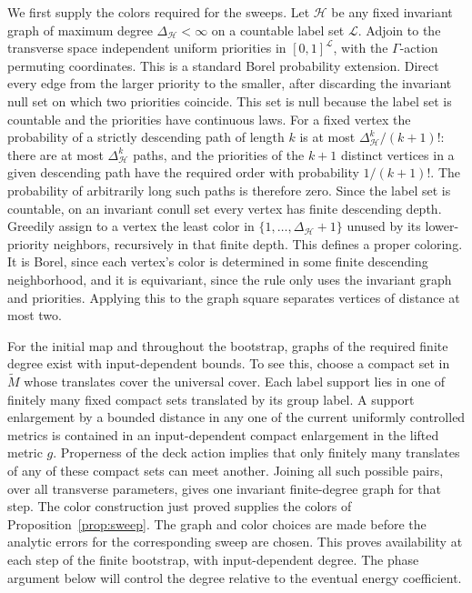 We first supply the colors required for the sweeps.  Let \(\mathcal H\)
be any fixed invariant graph of maximum degree
\(\Delta_{\mathcal H}<\infty\) on a countable label set \(\mathcal L\).
Adjoin to the transverse space independent uniform priorities in
\([0,1]^{\mathcal L}\), with the \(\Gamma\)-action permuting coordinates.
This is a standard Borel probability extension.  Direct every edge
from the larger priority to the smaller, after discarding the invariant
null set on which two priorities coincide.  This set is null because the
label set is countable and the priorities have continuous laws.  For a
fixed vertex the probability of a strictly descending path of length
\(k\) is at most \(\Delta_{\mathcal H}^k/(k+1)!\): there are at most
\(\Delta_{\mathcal H}^k\) paths, and the priorities of the \(k+1\)
distinct vertices in a given descending path have the required order
with probability \(1/(k+1)!\).  The probability of arbitrarily long
such paths is therefore zero.  Since the label set is countable, on
an invariant conull set every vertex has finite descending depth.
Greedily assign to a vertex the least color in
\(\{1,\ldots,\Delta_{\mathcal H}+1\}\) unused by its lower-priority
neighbors, recursively in that finite depth.  This defines a proper
coloring.  It is Borel, since each vertex's color is determined in
some finite descending neighborhood, and it is equivariant, since
the rule only uses the invariant graph and priorities.  Applying this
to the graph square separates vertices of distance at most two.

For the initial map and throughout the bootstrap, graphs of the
required finite degree exist with input-dependent bounds.  To see
this, choose a compact set in \(\widetilde M\) whose translates cover
the universal cover.  Each label support lies in one of finitely many
fixed compact sets translated by its group label.  A support
enlargement by a bounded distance in any one of the current uniformly
controlled metrics is contained in an input-dependent compact
enlargement in the lifted metric \(g\).  Properness of the deck action
implies that only finitely many translates of any of these compact
sets can meet another.  Joining all such possible pairs, over all
transverse parameters, gives one invariant finite-degree graph for
that step.  The color construction just proved supplies the colors
of Proposition~\ref{prop:sweep}.  The graph and color choices are
made before the analytic errors for the corresponding sweep are
chosen.  This proves availability at each step of the finite
bootstrap, with input-dependent degree.  The phase argument below
will control the degree relative to the eventual energy coefficient.

